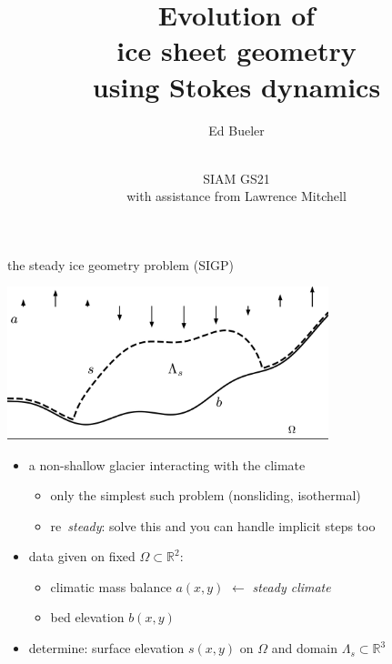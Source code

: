 \documentclass{beamer}
\title{Evolution of \\ ice sheet geometry \\ using Stokes dynamics}
\author{Ed Bueler}
\date{\phantom{foo} \bigskip \bigskip \bigskip \\ SIAM GS21 \\ with assistance from Lawrence Mitchell}
\newcommand{\RR}{\mathbb{R}}
\begin{document}
\begin{frame}
	\maketitle
\end{frame}


\begin{frame}{the steady ice geometry problem (SIGP)}

\vspace{-2mm}
\begin{center}
\includegraphics[width=0.7\textwidth]{figs/stokesdomain.png}
\end{center}

\vspace{-1mm}
\begin{itemize}
\item a non-shallow glacier interacting with the climate
    \begin{itemize}
    \item only the simplest such problem (nonsliding, isothermal)
    \item re~\emph{steady}: solve this and you can handle implicit steps too
    \end{itemize}
\item data given on fixed $\Omega \subset \RR^2$:
    \begin{itemize}
    \item climatic mass balance $a(x,y)$ \hfill $\gets$ \emph{steady climate}
    \item bed elevation $b(x,y)$
    \end{itemize}
\item determine: surface elevation $s(x,y)$ on $\Omega$ and domain $\Lambda_s \subset \RR^3$
\end{itemize}
\end{frame}
\end{document}
